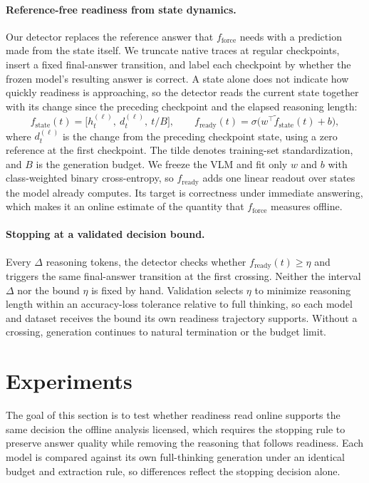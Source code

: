 \documentclass{article} %
\begin{document}
\paragraph{Reference-free readiness from state dynamics.}
Our detector replaces the reference answer that $f_{\mathrm{force}}$ needs with a prediction made from the state itself. We truncate native traces at regular checkpoints, insert a fixed final-answer transition, and label each checkpoint by whether the frozen model's resulting answer is correct. A state alone does not indicate how quickly readiness is approaching, so the detector reads the current state together with its change since the preceding checkpoint and the elapsed reasoning length:
\begin{equation}
    f_{\mathrm{state}}(t)=\bigl[h_t^{(\ell)},\ d_t^{(\ell)},\ t/B\bigr],
    \qquad
    f_{\mathrm{ready}}(t)=\sigma\bigl(w^\top\tilde f_{\mathrm{state}}(t)+b\bigr),
\end{equation}
where $d_t^{(\ell)}$ is the change from the preceding checkpoint state, using a zero reference at the first checkpoint. The tilde denotes training-set standardization, and $B$ is the generation budget. We freeze the VLM and fit only $w$ and $b$ with class-weighted binary cross-entropy, so $f_{\mathrm{ready}}$ adds one linear readout over states the model already computes. Its target is correctness under immediate answering, which makes it an online estimate of the quantity that $f_{\mathrm{force}}$ measures offline.

\paragraph{Stopping at a validated decision bound.}
Every $\Delta$ reasoning tokens, the detector checks whether $f_{\mathrm{ready}}(t)\geq\eta$ and triggers the same final-answer transition at the first crossing. Neither the interval $\Delta$ nor the bound $\eta$ is fixed by hand. Validation selects $\eta$ to minimize reasoning length within an accuracy-loss tolerance relative to full thinking, so each model and dataset receives the bound its own readiness trajectory supports. Without a crossing, generation continues to natural termination or the budget limit.

\section{Experiments}
\label{sec:experiments}

The goal of this section is to test whether readiness read online supports the same decision the offline analysis licensed, which requires the stopping rule to preserve answer quality while removing the reasoning that follows readiness. Each model is compared against its own full-thinking generation under an identical budget and extraction rule, so differences reflect the stopping decision alone.
\end{document}
